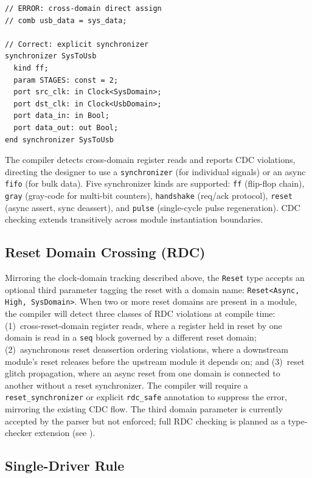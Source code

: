\documentclass[11pt,twocolumn]{article}
\begin{document}
\begin{lstlisting}[language=Arch,caption={Clock domain crossing via synchronizer},label={lst:cdc}]
// ERROR: cross-domain direct assign
// comb usb_data = sys_data;

// Correct: explicit synchronizer
synchronizer SysToUsb
  kind ff;
  param STAGES: const = 2;
  port src_clk: in Clock<SysDomain>;
  port dst_clk: in Clock<UsbDomain>;
  port data_in: in Bool;
  port data_out: out Bool;
end synchronizer SysToUsb
\end{lstlisting}

The compiler detects cross-domain register reads and reports CDC violations, directing the designer to use a \texttt{synchronizer} (for individual signals) or an async \texttt{fifo} (for bulk data). Five synchronizer kinds are supported: \texttt{ff} (flip-flop chain), \texttt{gray} (gray-code for multi-bit counters), \texttt{handshake} (req/ack protocol), \texttt{reset} (async assert, sync deassert), and \texttt{pulse} (single-cycle pulse regeneration). CDC checking extends transitively across module instantiation boundaries.

\subsection{Reset Domain Crossing (RDC)}
\label{sec:rdc}

Mirroring the clock-domain tracking described above, the \texttt{Reset} type accepts an optional third parameter tagging the reset with a domain name: \texttt{Reset<Async, High, SysDomain>}. When two or more reset domains are present in a module, the compiler will detect three classes of RDC violations at compile time:
(1)~cross-reset-domain register reads, where a register held in reset by one domain is read in a \texttt{seq} block governed by a different reset domain;
(2)~asynchronous reset deassertion ordering violations, where a downstream module's reset releases before the upstream module it depends on; and
(3)~reset glitch propagation, where an async reset from one domain is connected to another without a reset synchronizer.
The compiler will require a \texttt{reset\_synchronizer} or explicit \texttt{rdc\_safe} annotation to suppress the error, mirroring the existing CDC flow. The third domain parameter is currently accepted by the parser but not enforced; full RDC checking is planned as a type-checker extension (see ).

\subsection{Single-Driver Rule}
\end{document}
